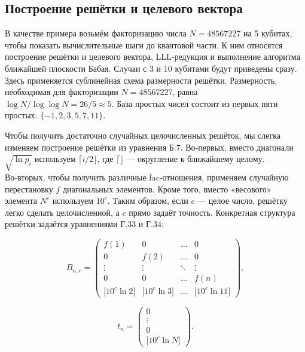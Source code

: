 
\subsection*{Построение решётки и целевого вектора}

В качестве примера возьмём факторизацию числа \(N = 48567227\) на 5 кубитах,
чтобы показать вычислительные шаги до квантовой части. К ним относятся
построение решётки и целевого вектора, LLL‐редукция и выполнение алгоритма
ближайшей плоскости Бабая. Случаи с 3 и 10 кубитами будут приведены сразу.
Здесь применяется сублинейная схема размерности решётки. Размерность,
необходимая для факторизации \(N = 48567227\), равна \(\log N / \log\log N =
26/5 \approx 5\). База простых чисел состоит из первых пяти простых: \(\{-1, 2,
3, 5, 7, 11\}\).

Чтобы получить достаточно случайных целочисленных решёток, мы слегка изменяем
построение решётки из уравнения Б.7. Во‑первых, вместо диагонали \(\sqrt{\ln
p_i}\) используем \(\lceil i/2 \rfloor\), где \(\lceil\rfloor\) — округление к
ближайшему целому. Во‑вторых, чтобы получить различные fac‐отношения, применяем
случайную перестановку \(f\) диагональных элементов. Кроме того, вместо
«весового» элемента \(N^{c}\) используем \(10^{c}\). Таким образом, если \(c\)
— целое число, решётку легко сделать целочисленной, а \(c\) прямо задаёт
точность. Конкретная структура решётки задаётся уравнениями Г.33 и Г.34:

\begin{equation}
B_{n,c}=
\begin{pmatrix}
f(1) & 0 & \dots & 0 \\
0 & f(2) & \dots & 0 \\
\vdots & \vdots & \ddots & \vdots \\
0 & 0 & \dots & f(n) \\
\bigl[10^{c}\ln 2\bigr] & \bigl[10^{c}\ln 3\bigr] & \dots & \bigl[10^{c}\ln 11\bigr]
\end{pmatrix},
\end{equation}

\begin{equation}
t_{n}=
\begin{pmatrix}
0 \\ \vdots \\ 0 \\ \bigl[10^{c}\ln N\bigr]
\end{pmatrix}.
\end{equation}

